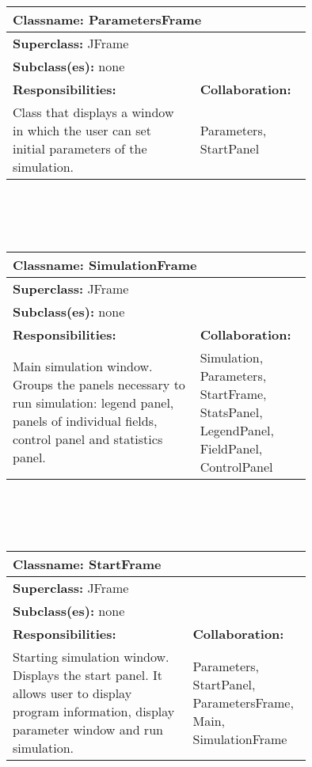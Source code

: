 \documentclass{article}
\begin{document}
\\ \\ \\
\begin{tabular}{|p{0.55\linewidth}|p{0.2\linewidth}|}
\hline
\multicolumn{2}{|l|}{\textbf{Classname:} ParametersFrame} \\
\hline
\multicolumn{2}{|l|}{\textbf{Superclass:} JFrame} \\
\multicolumn{2}{|l|}{\textbf{Subclass(es):} none} \\
\hline
\textbf{Responsibilities:}  &  \textbf{Collaboration:} \\
Class that displays a window in which the user can set initial parameters of the simulation. & Parameters, StartPanel \\
\hline
\end{tabular}
\\ \\ \\
\begin{tabular}{|p{0.55\linewidth}|p{0.2\linewidth}|}
\hline
\multicolumn{2}{|l|}{\textbf{Classname:} SimulationFrame} \\
\hline
\multicolumn{2}{|l|}{\textbf{Superclass:} JFrame} \\
\multicolumn{2}{|l|}{\textbf{Subclass(es):} none} \\
\hline
\textbf{Responsibilities:}  &  \textbf{Collaboration:} \\
Main simulation window. Groups the panels necessary to run simulation: legend panel, panels of individual fields, control panel and statistics panel. & Simulation, Parameters, StartFrame, StatsPanel, LegendPanel, FieldPanel, ControlPanel \\
\hline
\end{tabular}
\\ \\ \\
\begin{tabular}{|p{0.55\linewidth}|p{0.2\linewidth}|}
\hline
\multicolumn{2}{|l|}{\textbf{Classname:} StartFrame} \\
\hline
\multicolumn{2}{|l|}{\textbf{Superclass:} JFrame} \\
\multicolumn{2}{|l|}{\textbf{Subclass(es):} none} \\
\hline
\textbf{Responsibilities:}  &  \textbf{Collaboration:} \\
Starting simulation window. Displays the start panel. It allows user to display program information, display parameter window and run simulation. & Parameters, StartPanel, ParametersFrame, Main, SimulationFrame \\
\hline
\end{tabular}
\end{document}
